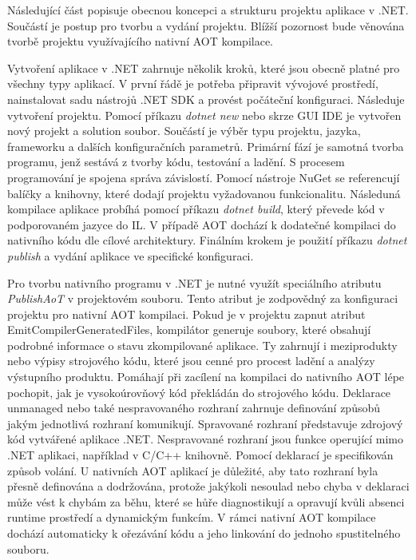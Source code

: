 
Následující část popisuje obecnou koncepci a strukturu projektu aplikace v .NET. Součástí je postup pro tvorbu a vydání projektu. Blížší pozornost bude věnována tvorbě projektu využívajícího nativní AOT kompilace.


Vytvoření aplikace v .NET zahrnuje několik kroků, které jsou obecně platné pro všechny typy aplikací. V první řádě je potřeba připravit vývojové prostředí, nainstalovat sadu nástrojů .NET SDK a provést počáteční konfiguraci. Následuje vytvoření projektu. Pomocí příkazu \emph{dotnet new} nebo skrze GUI IDE je vytvořen nový projekt a solution soubor. Součástí je výběr typu projektu, jazyka, frameworku a dalších konfiguračních parametrů. Primární fází je samotná tvorba programu, jenž sestává z tvorby kódu, testování a ladění. \cite{Price2023} S procesem programování je spojena správa závislostí. Pomocí nástroje NuGet se referencují balíčky a knihovny, které dodají projektu vyžadovanou funkcionalitu. Následuná kompilace aplikace probíhá pomocí příkazu \emph{dotnet build}, který převede kód v podporovaném jazyce do IL. V případě AOT dochází k dodatečné kompilaci do nativního kódu dle cílové architektury. Finálním krokem je použití příkazu \emph{dotnet publish} a vydání aplikace ve specifické konfiguraci. 


Pro tvorbu nativního programu v .NET je nutné využít speciálního atributu \emph{PublishAoT} v projektovém souboru. Tento atribut je zodpovědný za konfiguraci projektu pro nativní AOT kompilaci. Pokud je v projektu zapnut atribut EmitCompilerGeneratedFiles, kompilátor generuje soubory, které obsahují podrobné informace o stavu zkompilované aplikace. Ty zahrnují i meziprodukty nebo výpisy strojového kódu, které jsou cenné pro procest ladění a analýzy výstupního produktu. \cite{netdocssg} Pomáhají při zacílení na kompilaci do nativního AOT lépe pochopit, jak je vysokoúrovňový kód překládán do strojového kódu. Deklarace unmanaged nebo také nespravovaného rozhraní zahrnuje definování způsobů jakým jednotlivá rozhraní komunikují. Spravované rozhraní představuje zdrojový kód vytvářené aplikace .NET. Nespravované rozhraní jsou funkce operující mimo .NET aplikaci, například v C/C++ knihovně. \cite{Troelsen2003} Pomocí deklarací je specifikován způsob volání. U nativních AOT aplikací je důležité, aby tato rozhraní byla přesně definována a dodržována, protože jakýkoli nesoulad nebo chyba v deklaraci může vést k chybám za běhu, které se hůře diagnostikují a opravují kvůli absenci runtime prostředí a dynamickým funkcím. V rámci nativní AOT kompilace dochází automaticky k ořezávání kódu a jeho linkování do jednoho spustitelného souboru.


